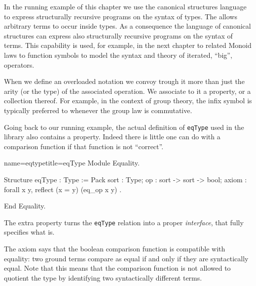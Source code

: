 
In the running example of this chapter we use the canonical structures
language to express structurally recursive programs on the syntax
of types.  The \mcbCIC{} allows arbitrary terms to occur inside
types.  As a consequence the language of canonical structures can
express also structurally recursive programs on the syntax
of terms.  This capability is used, for example, in the next
chapter to related Monoid laws to function symbols to model
the syntax and theory of iterated, ``big'', operators.


When we define an overloaded notation we convoy
trough it more than just the arity (or the type) of the associated
operation.  We associate to it a property, or a collection thereof.
For example, in the context of group theory, the infix \C{+} symbol
is typically preferred to \C{*} whenever the group law is
commutative.

Going back to our running example, the actual definition of \lstinline/eqType/
used in the \mcbMC{} library also contains a property.
Indeed there is little one can do with a comparison function if that
function is not ``correct''.

\begin{coq}{name=eqtype}{title=eqType}
Module Equality.

Structure eqType : Type := Pack {
  sort : Type;
  op : sort -> sort -> bool;
  axiom : forall x y, reflect (x = y) (eq_op x y)
}.

End Equality.
\end{coq}

The extra property turns the
\lstinline/eqType/ relation into a proper \emph{interface},
that fully specifies what  is.

The axiom says that the boolean comparison function
is compatible with equality: two ground terms compare as equal if and
only if they are syntactically equal.  Note that this means that the
comparison function is not allowed to quotient the type by identifying
two syntactically different terms.

